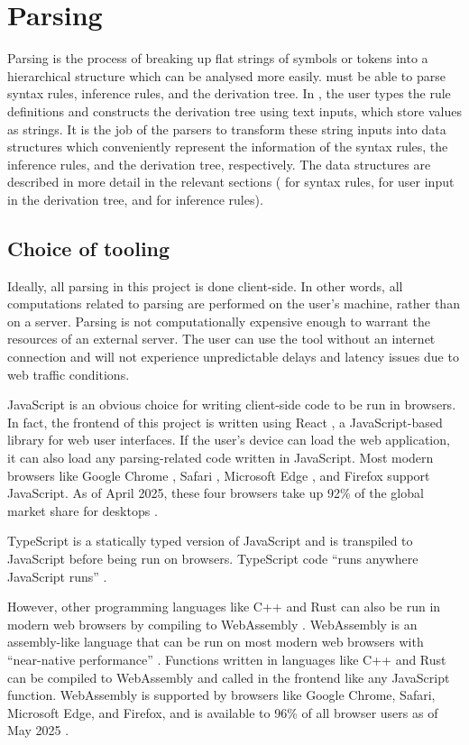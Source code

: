 \section{Parsing}
\label{background:parsing}
Parsing is the process of breaking up flat strings of symbols or tokens into a hierarchical structure which can be analysed more easily. \projectname{} must be able to parse syntax rules, inference rules, and the derivation tree. In \projectname{}, the user types the rule definitions and constructs the derivation tree using text inputs, which store values as strings. It is the job of the parsers to transform these string inputs into data structures which conveniently represent the information of the syntax rules, the inference rules, and the derivation tree, respectively. The data structures are described in more detail in the relevant sections ( for syntax rules,  for user input in the derivation tree, and  for inference rules).

\subsection{Choice of tooling}
Ideally, all parsing in this project is done client-side. In other words, all computations related to parsing are performed on the user's machine, rather than on a server. Parsing is not computationally expensive enough to warrant the resources of an external server. The user can use the tool without an internet connection and will not experience unpredictable delays and latency issues due to web traffic conditions.

JavaScript \cite{javascript} is an obvious choice for writing client-side code to be run in browsers. In fact, the frontend of this project is written using React \cite{react}, a JavaScript-based library for web user interfaces. If the user's device can load the web application, it can also load any parsing-related code written in JavaScript. Most modern browsers like Google Chrome \cite{chrome}, Safari \cite{safari}, Microsoft Edge \cite{edge}, and Firefox \cite{firefox} support JavaScript. As of April 2025, these four browsers take up 92\% of the global market share for desktops \cite{statcounter}.

TypeScript \cite{typescript} is a statically typed version of JavaScript and is transpiled to JavaScript before being run on browsers. TypeScript code ``runs anywhere JavaScript runs'' \cite{typescript}.

However, other programming languages like C++ and Rust can also be run in modern web browsers by compiling to WebAssembly \cite{webassembly}. WebAssembly is an assembly-like language that can be run on most modern web browsers with ``near-native performance'' \cite{webassembly}. Functions written in languages like C++ and Rust can be compiled to WebAssembly and called in the frontend like any JavaScript function. WebAssembly is supported by browsers like Google Chrome, Safari, Microsoft Edge, and Firefox, and is available to 96\% of all browser users as of May 2025 \cite{webassembly:caniuse}.

